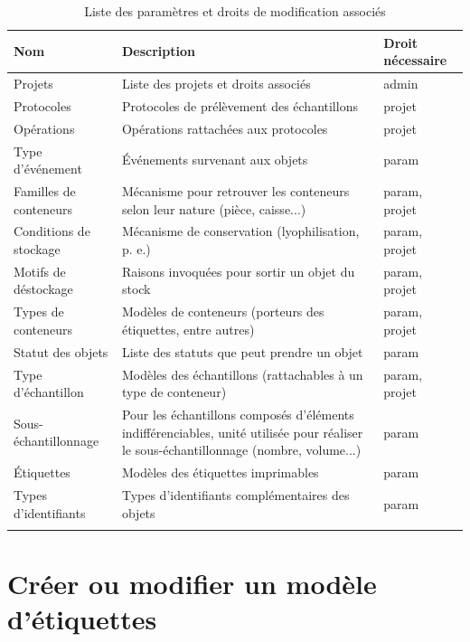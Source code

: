 \begin{longtable}{|p{4cm}|p{8cm}| p{3cm}|}
\hline
\textbf{Nom} & \textbf{Description} & \textbf{Droit nécessaire} \\
\hline
\endhead
Projets & Liste des projets et droits associés & admin \\
\hline
Protocoles & Protocoles de prélèvement des échantillons & projet \\
\hline
Opérations & Opérations rattachées aux protocoles & projet \\
\hline
Type d'événement & Événements survenant aux objets & param \\
\hline
Familles de conteneurs & Mécanisme pour retrouver les conteneurs selon leur nature (pièce, caisse...) & param, projet\\
\hline
Conditions de stockage & Mécanisme de conservation (lyophilisation, p. e.) & param, projet\\
\hline
Motifs de déstockage & Raisons invoquées pour sortir un objet du stock & param, projet\\
\hline
Types de conteneurs & Modèles de conteneurs (porteurs des étiquettes, entre autres) & param, projet\\
\hline
Statut des objets & Liste des statuts que peut prendre un objet & param\\
\hline
Type d'échantillon & Modèles des échantillons (rattachables à un type de conteneur) &  param, projet\\
\hline
Sous-échantillonnage & Pour les échantillons composés d'éléments indifférenciables, unité utilisée pour réaliser le sous-échantillonnage (nombre, volume...) & param \\
\hline
Étiquettes & Modèles des étiquettes imprimables & param \\
\hline
Types d'identifiants & Types d'identifiants complémentaires des objets & param \\
\hline

\caption{Liste des paramètres et droits de modification associés}
\end{longtable}

\section{Créer ou modifier un modèle d'étiquettes}

